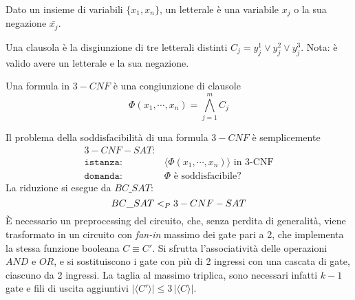 \begin{definition}[Letterale]
    \label{def:letterale}
    Dato un insieme di variabili $\{ x_1, x_n \}$, un letterale è una variabile $x_j$ o la sua negazione $\bar{x_j}$.
\end{definition}

\begin{definition}[Clausola]
    \label{def:clausola}
    Una clausola è la disgiunzione di tre letterali distinti $C_j =y_j^1 \vee y_j^2 \vee y_j^3$.
    Nota: è valido avere un letterale e la sua negazione.
\end{definition}

\begin{definition}
    Una formula in $3-CNF$ è una congiunzione di clausole
    \begin{equation*}
        \Phi \left( x_1, \cdots, x_n \right) = 
        \bigwedge\limits_{j=1}^{m}
        C_j
    \end{equation*}
    \label{def:formulacnf}
\end{definition}
Il problema della soddisfacibilità di una formula $3-CNF$ è semplicemente
\begin{align*}
    3-CNF-SAT: & \\
    \texttt{istanza:} \quad & \langle \Phi \left( x_1, \cdots, x_n \right) \rangle \text{ in 3-CNF} \\
    \texttt{domanda:} \quad & \Phi \text{ è soddisfacibile?}
\end{align*}
La riduzione si esegue da $BC\_SAT$:
\begin{equation*}
    BC\_SAT <_P 3-CNF-SAT
\end{equation*}
È necessario un preprocessing del circuito, che, senza perdita di generalità, viene trasformato in un circuito con \emph{fan-in} massimo dei gate pari a 2, che implementa la stessa funzione booleana $C \equiv C'$. Si sfrutta l'associatività delle operazioni $AND$ e $OR$, e si sostituiscono i gate con più di 2 ingressi con una cascata di gate, ciascuno da 2 ingressi. La taglia al massimo triplica, sono necessari infatti $k - 1$ gate e fili di uscita aggiuntivi $|\langle C' \rangle| \le 3 \, |\langle C \rangle|$.

